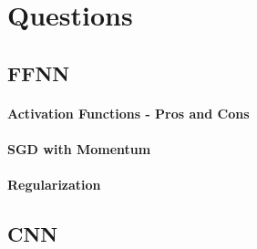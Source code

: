 \section{Questions}

\subsection{FFNN}
\paragraph{Activation Functions - Pros and Cons}

\paragraph{SGD with Momentum}

\paragraph{Regularization}

\subsection{CNN}
